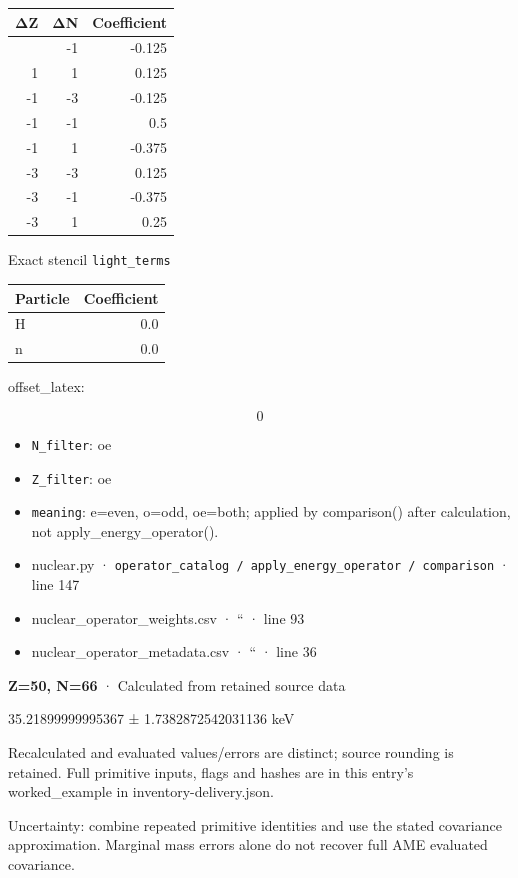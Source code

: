 \documentclass[
  11pt,
  letterpaper,
]{article}
\begin{document}
\begin{longtable}[]{@{}rrr@{}}
\toprule\noalign{}
ΔZ & ΔN & Coefficient \\
\midrule\noalign{}
\endhead
\bottomrule\noalign{}
\endlastfoot
1 & -1 & -0.125 \\
1 & 1 & 0.125 \\
-1 & -3 & -0.125 \\
-1 & -1 & 0.5 \\
-1 & 1 & -0.375 \\
-3 & -3 & 0.125 \\
-3 & -1 & -0.375 \\
-3 & 1 & 0.25 \\
\end{longtable}

Exact stencil \texttt{light\_terms}

\begin{longtable}[]{@{}lr@{}}
\toprule\noalign{}
Particle & Coefficient \\
\midrule\noalign{}
\endhead
\bottomrule\noalign{}
\endlastfoot
H & 0.0 \\
n & 0.0 \\
\end{longtable}

offset\_latex:

\[
0
\]

\begin{itemize}
\item
  \texttt{N\_filter}: oe
\item
  \texttt{Z\_filter}: oe
\item
  \texttt{meaning}: e=even, o=odd, oe=both; applied by comparison()
  after calculation, not apply\_energy\_operator().
\item
  nuclear.py ·
  \texttt{operator\_catalog\ /\ apply\_energy\_operator\ /\ comparison}
  · line 147
\item
  nuclear\_operator\_weights.csv · `` · line 93
\item
  nuclear\_operator\_metadata.csv · `` · line 36
\end{itemize}

\textbf{Z=50, N=66} · Calculated from retained source data

35.21899999995367 ± 1.7382872542031136 keV

Recalculated and evaluated values/errors are distinct; source rounding
is retained. Full primitive inputs, flags and hashes are in this entry's
worked\_example in inventory-delivery.json.

Uncertainty: combine repeated primitive identities and use the stated
covariance approximation. Marginal mass errors alone do not recover full
AME evaluated covariance.
\end{document}
